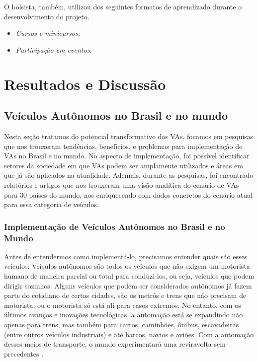 O bolsista, também, utilizou dos seguintes formatos de aprendizado durante o desenvolvimento do projeto.
\begin{itemize}
\item \textit{Cursos e minicursos;}
\item \textit{Participação em eventos.}
\end{itemize}

\newpage

\chapter{Resultados e Discussão} \label{resultados}

\section{Veículos Autônomos no Brasil e no mundo}

Nesta seção tratamos do potencial transformativo dos VAs, focamos em pesquisas que nos trouxeram tendências, benefícios, e problemas para implementação de VAs no Brasil e no mundo. No aspecto de implementação, foi possível identificar setores da sociedade em que VAs podem ser amplamente utilizados e áreas em que já são aplicados na atualidade. Ademais, durante as pesquisas, foi encontrado relatórios e artigos que nos trouxeram uma visão analítica do cenário de VAs para 30 países do mundo, nos enriquecendo com dados concretos do cenário atual para essa categoria de veículos. 

\subsection{Implementação de Veículos Autônomos no Brasil e no Mundo}

Antes de entendermos como implementá-lo, precisamos entender quais são esses veículos: Veículos autônomos são todos os veículos que não exigem um motorista humano de maneira parcial ou total para conduzi-los, ou seja, veículos que podem dirigir sozinhos. Alguns veículos que podem ser considerados autônomos já fazem parte do cotidiano de certas cidades, são os metrôs e trens que não precisam de motorista, ou o motorista só está ali para casos extremos. No entanto, com os últimos avanços e inovações tecnológicas, a automação está se expandindo não apenas para trens, mas também para carros, caminhões, ônibus, escavadeiras (entre outros veículos industriais) e até barcos, navios e aviões. Com a automação desses meios de transporte, o mundo experimentará uma reviravolta sem precedentes \cite{4cenarios_ocidental}.

